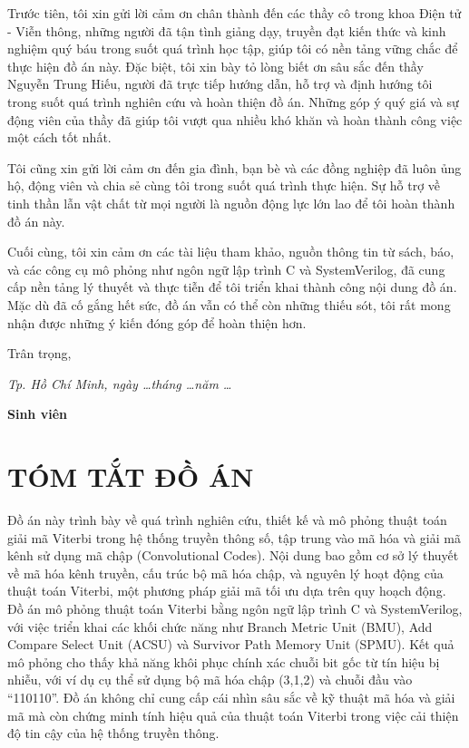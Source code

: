 Trước tiên, tôi xin gửi lời cảm ơn chân thành đến các thầy cô trong khoa Điện tử - Viễn thông, những người đã tận tình giảng dạy, truyền đạt kiến thức và kinh nghiệm quý báu trong suốt quá trình học tập, giúp tôi có nền tảng vững chắc để thực hiện đồ án này. Đặc biệt, tôi xin bày tỏ lòng biết ơn sâu sắc đến thầy Nguyễn Trung Hiếu, người đã trực tiếp hướng dẫn, hỗ trợ và định hướng tôi trong suốt quá trình nghiên cứu và hoàn thiện đồ án. Những góp ý quý giá và sự động viên của thầy đã giúp tôi vượt qua nhiều khó khăn và hoàn thành công việc một cách tốt nhất.

Tôi cũng xin gửi lời cảm ơn đến gia đình, bạn bè và các đồng nghiệp đã luôn ủng hộ, động viên và chia sẻ cùng tôi trong suốt quá trình thực hiện. Sự hỗ trợ về tinh thần lẫn vật chất từ mọi người là nguồn động lực lớn lao để tôi hoàn thành đồ án này.

Cuối cùng, tôi xin cảm ơn các tài liệu tham khảo, nguồn thông tin từ sách, báo, và các công cụ mô phỏng như ngôn ngữ lập trình C và SystemVerilog, đã cung cấp nền tảng lý thuyết và thực tiễn để tôi triển khai thành công nội dung đồ án. Mặc dù đã cố gắng hết sức, đồ án vẫn có thể còn những thiếu sót, tôi rất mong nhận được những ý kiến đóng góp để hoàn thiện hơn.

Trân trọng,

\vspace{6cm}
\hspace{6cm} \textit{Tp. Hồ Chí Minh, ngày \dots tháng \dots năm \dots }

\hspace{10cm} \textbf{Sinh viên}

\newpage
{}
\section*{\centering TÓM TẮT ĐỒ ÁN}

Đồ án này trình bày về quá trình nghiên cứu, thiết kế và mô phỏng thuật toán giải mã Viterbi trong hệ thống truyền thông số, tập trung vào mã hóa và giải mã kênh sử dụng mã chập (Convolutional Codes). Nội dung bao gồm cơ sở lý thuyết về mã hóa kênh truyền, cấu trúc bộ mã hóa chập, và nguyên lý hoạt động của thuật toán Viterbi, một phương pháp giải mã tối ưu dựa trên quy hoạch động. Đồ án mô phỏng thuật toán Viterbi bằng ngôn ngữ lập trình C và SystemVerilog, với việc triển khai các khối chức năng như Branch Metric Unit (BMU), Add Compare Select Unit (ACSU) và Survivor Path Memory Unit (SPMU). Kết quả mô phỏng cho thấy khả năng khôi phục chính xác chuỗi bit gốc từ tín hiệu bị nhiễu, với ví dụ cụ thể sử dụng bộ mã hóa chập (3,1,2) và chuỗi đầu vào “110110”. Đồ án không chỉ cung cấp cái nhìn sâu sắc về kỹ thuật mã hóa và giải mã mà còn chứng minh tính hiệu quả của thuật toán Viterbi trong việc cải thiện độ tin cậy của hệ thống truyền thông.

\newpage
\tableofcontents
\listoffigures
\listoftables
